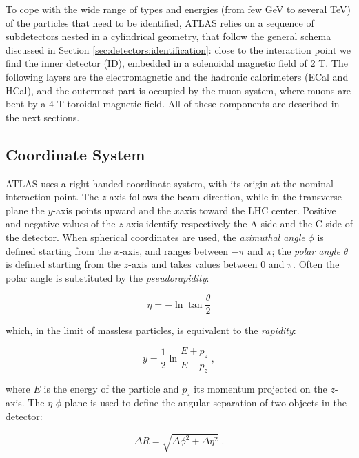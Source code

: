 To cope with the wide range of types and energies (from few GeV to several TeV) of the particles that need to be identified, ATLAS relies on a sequence of subdetectors nested in a cylindrical geometry, that follow the general schema discussed in Section \ref{sec:detectors:identification}: close to the interaction point we find the inner detector (ID), embedded in a solenoidal magnetic field of 2 T. The following layers are the electromagnetic and the hadronic calorimeters (ECal and HCal), and the outermost part is occupied by the muon system, where muons are bent by a 4-T toroidal magnetic field. All of these components are described in the next sections.

\subsection{Coordinate System}

ATLAS uses a right-handed coordinate system, with its origin at the nominal interaction point. The $z$-axis follows the beam direction, while in the transverse plane the $y$-axis points upward and the $x$axis toward the LHC center. Positive and negative values of the $z$-axis identify respectively the A-side and the C-side of the detector. When spherical coordinates are used, the \textit{azimuthal angle} $\phi$ is defined starting from the $x$-axis, and ranges between $-\pi$ and $\pi$; the \textit{polar angle} $\theta$ is defined starting from the $z$-axis and takes values between $0$ and $\pi$. Often the polar angle is substituted by the \textit{pseudorapidity}: 
 
\begin{equation}
\label{eq:cern:eta}
\eta = - \ln \tan \frac{\theta}{2}
\end{equation}

which, in the limit of massless particles, is equivalent to the \textit{rapidity}:

\begin{equation}
\label{eq:cern:y}
y = \frac{1}{2} \ln \frac{E + p_z}{E - p_z} \; ,
\end{equation}

where $E$ is the energy of the particle and $p_z$ its momentum projected on the $z$-axis. The $\eta$-$\phi$ plane is used to define the angular separation of two objects in the detector:

\begin{equation}
\label{eq:cern:dR}
\Delta R = \sqrt{ \Delta \phi^2 + \Delta \eta^2  } \; .
\end{equation}

